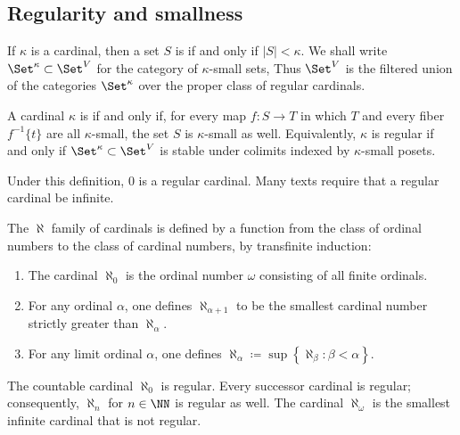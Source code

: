 \subsection{Regularity and smallness}%
\label{sub:regularity_and_smallness}

\begin{definition}
	If $ \kappa $ is a cardinal,
	then a set $ S $ is 
	if and only if $ |S| < \kappa $.
	We shall write $ \Set^{\kappa} \subset \Set^V$
	for the category of $ \kappa $-small sets,
	Thus $ \Set^V $ is the filtered union of the categories $ \Set^{\kappa} $
	over the proper class of regular cardinals.
	
	A cardinal $ \kappa $ is 
	if and only if, for every map $ f \colon S \to T $
	in which $ T $ and every fiber $ f^{-1}\{t\} $ are all $ \kappa $-small,
	the set $ S $ is $ \kappa $-small as well.
	Equivalently, $ \kappa $ is regular if and only if
	$ \Set^{\kappa} \subset \Set^V $ is stable under colimits indexed by $ \kappa $-small posets.
\end{definition}

\begin{eg}
	Under this definition, $ 0 $ is a regular cardinal.
	Many texts require that a regular cardinal be infinite.
\end{eg}

\begin{eg}
	The $ \aleph $ family of cardinals is defined by
	a function from the class of ordinal numbers
	to the class of cardinal numbers, by transfinite induction:
	\begin{enumerate}
		\item The cardinal $ \aleph_0 $ is the ordinal number
			$ \omega $ consisting of all finite ordinals.
		\item For any ordinal $ \alpha $,
			one defines $ \aleph_{\alpha + 1} $ to be
			the smallest cardinal number strictly greater than $ \aleph_{\alpha} $.
		\item For any limit ordinal $ \alpha $,
			one defines $ \aleph_{\alpha} \coloneq \sup \left\{ \aleph_{\beta} : \beta < \alpha \right\} $.
	\end{enumerate}

	The countable cardinal $ \aleph_0 $ is regular.
	Every successor cardinal is regular;
	consequently, $ \aleph_n $ for $ n \in \NN $ is regular as well.
	The cardinal $ \aleph_{\omega} $ is
	the smallest infinite cardinal that is not regular.
\end{eg}

